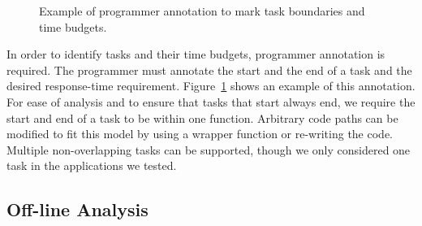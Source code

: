 \begin{figure}
\begin{center}
    \caption{Example of programmer annotation to mark task boundaries and time
    budgets.}
    \label{fig:exec_time_prediction.system.programmer_annotation}
  \end{center}
\end{figure}

In order to identify tasks and their time budgets, programmer annotation is
required. The programmer must annotate the start and the end of a task and the
desired response-time requirement.
Figure~\ref{fig:exec_time_prediction.system.programmer_annotation} shows an
example of this annotation.  For ease of analysis and to ensure that tasks that
start always end, we require the start and end of a task to be within one
function.  Arbitrary code paths can be modified to fit this model by using a
wrapper function or re-writing the code. Multiple non-overlapping tasks can be
supported, though we only considered one task in the applications we tested.

\subsection{Off-line Analysis}

